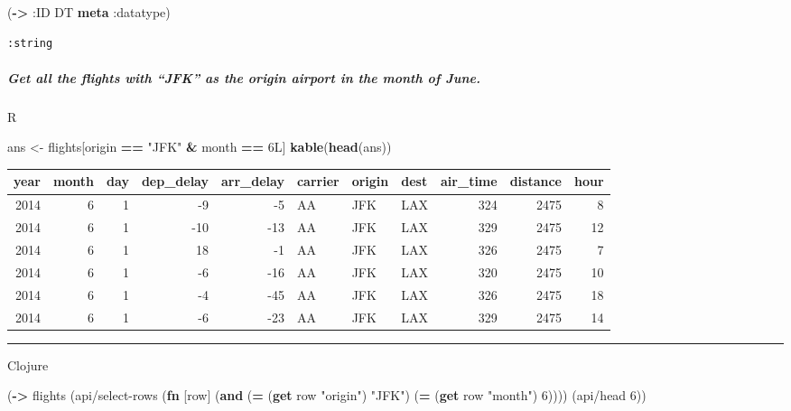 \documentclass[]{article}
\newenvironment{Shaded}{\begin{snugshade}}{\end{snugshade}}
\newcommand{\KeywordTok}[1]{\textcolor[rgb]{0.13,0.29,0.53}{\textbf{#1}}}
\newcommand{\DecValTok}[1]{\textcolor[rgb]{0.00,0.00,0.81}{#1}}
\newcommand{\StringTok}[1]{\textcolor[rgb]{0.31,0.60,0.02}{#1}}
\newcommand{\OperatorTok}[1]{\textcolor[rgb]{0.81,0.36,0.00}{\textbf{#1}}}
\newcommand{\AttributeTok}[1]{\textcolor[rgb]{0.77,0.63,0.00}{#1}}
\newcommand{\NormalTok}[1]{#1}
\let\oldsubparagraph\subparagraph
\renewcommand{\subparagraph}[1]{\oldsubparagraph{#1}\mbox{}}
\begin{document}
\begin{Shaded}
\begin{Highlighting}[]
\NormalTok{(}\KeywordTok{->} \AttributeTok{:ID}\NormalTok{ DT }\KeywordTok{meta} \AttributeTok{:datatype}\NormalTok{)}
\end{Highlighting}
\end{Shaded}

\begin{verbatim}
:string
\end{verbatim}

\subparagraph{\texorpdfstring{Get all the flights with ``JFK'' as the
origin airport in the month of
June.}{Get all the flights with JFK as the origin airport in the month of June.}}\label{get-all-the-flights-with-jfk-as-the-origin-airport-in-the-month-of-june.}

R

\begin{Shaded}
\begin{Highlighting}[]
\NormalTok{ans <-}\StringTok{ }\NormalTok{flights[origin }\OperatorTok{==}\StringTok{ "JFK"} \OperatorTok{&}\StringTok{ }\NormalTok{month }\OperatorTok{==}\StringTok{ }\NormalTok{6L]}
\KeywordTok{kable}\NormalTok{(}\KeywordTok{head}\NormalTok{(ans))}
\end{Highlighting}
\end{Shaded}

\begin{longtable}[]{@{}rrrrrlllrrr@{}}
\toprule
year & month & day & dep\_delay & arr\_delay & carrier & origin & dest &
air\_time & distance & hour\tabularnewline
\midrule
\endhead
2014 & 6 & 1 & -9 & -5 & AA & JFK & LAX & 324 & 2475 & 8\tabularnewline
2014 & 6 & 1 & -10 & -13 & AA & JFK & LAX & 329 & 2475 &
12\tabularnewline
2014 & 6 & 1 & 18 & -1 & AA & JFK & LAX & 326 & 2475 & 7\tabularnewline
2014 & 6 & 1 & -6 & -16 & AA & JFK & LAX & 320 & 2475 &
10\tabularnewline
2014 & 6 & 1 & -4 & -45 & AA & JFK & LAX & 326 & 2475 &
18\tabularnewline
2014 & 6 & 1 & -6 & -23 & AA & JFK & LAX & 329 & 2475 &
14\tabularnewline
\bottomrule
\end{longtable}

\begin{center}\rule{0.5\linewidth}{0.5pt}\end{center}

Clojure

\begin{Shaded}
\begin{Highlighting}[]
\NormalTok{(}\KeywordTok{->}\NormalTok{ flights}
\NormalTok{    (api/select-rows (}\KeywordTok{fn}\NormalTok{ [row] (}\KeywordTok{and}\NormalTok{ (}\KeywordTok{=}\NormalTok{ (}\KeywordTok{get}\NormalTok{ row }\StringTok{"origin"}\NormalTok{) }\StringTok{"JFK"}\NormalTok{)}
\NormalTok{                                   (}\KeywordTok{=}\NormalTok{ (}\KeywordTok{get}\NormalTok{ row }\StringTok{"month"}\NormalTok{) }\DecValTok{6}\NormalTok{))))}
\NormalTok{    (api/head }\DecValTok{6}\NormalTok{))}
\end{Highlighting}
\end{Shaded}
\end{document}
